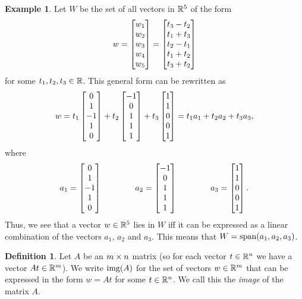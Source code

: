 \documentclass[reqno]{amsart}
\theoremstyle{definition}
\newtheorem{definition}[theorem]{Definition}
\newtheorem{example}[theorem]{Example}
\begin{document}
\begin{example}\label{eg-span-form-ii}
 Let $W$ be the set of all vectors in ${\mathbb{R}}^5$ of the form 
 \[ w = \left[\begin{matrix} w_1 \\ w_2 \\ w_3 \\ w_4 \\ w_5 \end{matrix}\right] 
      = \left[\begin{matrix} t_3 - t_2 \\
             t_1 + t_3 \\
             t_2 - t_1 \\
             t_1 + t_2 \\ 
             t_3 + t_2 \end{matrix}\right]
 \]
 for some $t_1,t_2,t_3\in{\mathbb{R}}$.  This general form can be rewritten as 
 \[ w = 
    t_1 \left[\begin{matrix}  0 \\  1 \\ -1 \\  1 \\  0 \end{matrix}\right] + 
    t_2 \left[\begin{matrix} -1 \\  0 \\  1 \\  1 \\  1 \end{matrix}\right] +
    t_3 \left[\begin{matrix}  1 \\  1 \\  0 \\  0 \\  1 \end{matrix}\right] = 
    t_1 a_1 + t_2 a_2 + t_3 a_3,
 \]
 where 
 \[ 
    a_1 = \left[\begin{matrix}  0 \\  1 \\ -1 \\  1 \\  0 \end{matrix}\right] \hspace{4em}
    a_2 = \left[\begin{matrix} -1 \\  0 \\  1 \\  1 \\  1 \end{matrix}\right] \hspace{4em}
    a_3 = \left[\begin{matrix}  1 \\  1 \\  0 \\  0 \\  1 \end{matrix}\right].
 \]
 Thus, we see that a vector $w\in{\mathbb{R}}^5$ lies in $W$ iff it can be
 expressed as a linear combination of the vectors $a_1$, $a_2$ and
 $a_3$.  This means that $W=\operatorname{span}(a_1,a_2,a_3)$.
\end{example}

\begin{definition}\label{defn-img}
 Let $A$ be an $m\times n$ matrix (so for each vector $t\in{\mathbb{R}}^n$ we have
 a vector $At\in{\mathbb{R}}^m$).  We write $\operatorname{img}(A)$ for the set of vectors
 $w\in{\mathbb{R}}^m$ that can be expressed in the form $w=At$ for some
 $t\in{\mathbb{R}}^n$.  We call this the \emph{image} of the matrix $A$.
\end{definition}
\end{document}
